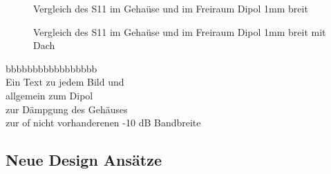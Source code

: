 \begin{figure}[!h]
	\centering
	\begingroup
	\endgroup
	\caption{Vergleich des S11 im Gehaüse und im Freiraum Dipol 1mm breit}
	\label{S11_Vergleich_Simulation_1mm}
\end{figure}

\begin{figure}[!h]
	\centering
	\begingroup
	\endgroup
	\caption{Vergleich des S11 im Gehaüse und im Freiraum Dipol 1mm breit mit Dach}
	\label{S11_Vergleich_Simulation_1mm_Dach}
\end{figure}

bbbbbbbbbbbbbbbbb\\
Ein Text zu jedem Bild und\\
allgemein zum Dipol\\
zur Dämpgung des Gehäuses\\
zur of nicht vorhanderenen -10 dB Bandbreite

\newpage 
\thispagestyle{empty}
\newpage 
\subsection{Neue Design Ansätze}